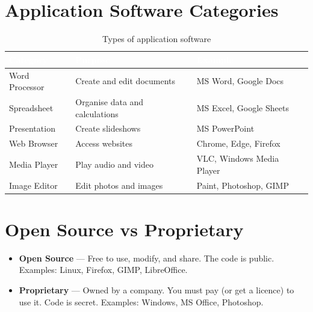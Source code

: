 \section{Application Software Categories}
\label{sec:app-categories}

\begin{table}[H]
\centering
\caption{Types of application software}
\label{tab:app-types}
\renewcommand{\arraystretch}{1.3}
\begin{tabularx}{\textwidth}{l X l}
\toprule
\rowcolor{HeaderRow}
\textcolor{white}{\textbf{Category}} & \textcolor{white}{\textbf{Purpose}} & \textcolor{white}{\textbf{Example}} \\
\midrule
\rowcolor{RowLight} Word Processor & Create and edit documents & MS Word, Google Docs \\
\rowcolor{RowDark} Spreadsheet & Organise data and calculations & MS Excel, Google Sheets \\
\rowcolor{RowLight} Presentation & Create slideshows & MS PowerPoint \\
\rowcolor{RowDark} Web Browser & Access websites & Chrome, Edge, Firefox \\
\rowcolor{RowLight} Media Player & Play audio and video & VLC, Windows Media Player \\
\rowcolor{RowDark} Image Editor & Edit photos and images & Paint, Photoshop, GIMP \\
\bottomrule
\end{tabularx}
\end{table}

\section{Open Source vs Proprietary}
\label{sec:opensource}

\begin{itemize}[leftmargin=*, label={\textcolor{ModuleBlue}{\faAngleRight}}, itemsep=4pt]
  \item \textbf{Open Source} --- Free to use, modify, and share. The code is public. Examples: Linux, Firefox, GIMP, LibreOffice.
  \item \textbf{Proprietary} --- Owned by a company. You must pay (or get a licence) to use it. Code is secret. Examples: Windows, MS Office, Photoshop.
\end{itemize}


